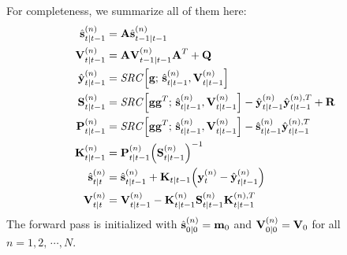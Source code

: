 		For completeness, we summarize all of them here:
		\begin{align*}
			\hat{\boldsymbol{\mathrm{s}}}_{t \vert t - 1}^{(n)} &= \boldsymbol{\mathrm{A}} \hat{\boldsymbol{\mathrm{s}}}_{t - 1 \vert t - 1}^{(n)} \\
			\boldsymbol{\mathrm{V}}_{t \vert t - 1}^{(n)} &= \boldsymbol{\mathrm{A}} \boldsymbol{\mathrm{V}}_{t - 1 \vert t - 1}^{(n)} \boldsymbol{\mathrm{A}}^T + \boldsymbol{\mathrm{Q}} \\
			\hat{\boldsymbol{\mathrm{y}}}_{t \vert t - 1}^{(n)} &= \mathit{SRC}\Big[ \boldsymbol{\mathrm{g}};\, \hat{\boldsymbol{\mathrm{s}}}_{t \vert t - 1}^{(n)}, \boldsymbol{\mathrm{V}}_{t \vert t - 1}^{(n)} \Big] \\
			\boldsymbol{\mathrm{S}}_{t \vert t - 1}^{(n)} &= \mathit{SRC}\Big[ \boldsymbol{\mathrm{g}} \boldsymbol{\mathrm{g}}^T;\, \hat{\boldsymbol{\mathrm{s}}}_{t \vert t - 1}^{(n)}, \boldsymbol{\mathrm{V}}_{t \vert t - 1}^{(n)} \Big] - \hat{\boldsymbol{\mathrm{y}}}_{t \vert t - 1}^{(n)} \hat{\boldsymbol{\mathrm{y}}}_{t \vert t - 1}^{(n), T} + \boldsymbol{\mathrm{R}} \\
			\boldsymbol{\mathrm{P}}_{t \vert t - 1}^{(n)} &= \mathit{SRC}\Big[ \boldsymbol{\mathrm{g}} \boldsymbol{\mathrm{g}}^T;\, \hat{\boldsymbol{\mathrm{s}}}_{t \vert t - 1}^{(n)}, \boldsymbol{\mathrm{V}}_{t \vert t - 1}^{(n)} \Big] - \hat{\boldsymbol{\mathrm{s}}}_{t \vert t - 1}^{(n)} \hat{\boldsymbol{\mathrm{y}}}_{t \vert t - 1}^{(n), T} \\
			\boldsymbol{\mathrm{K}}_{t \vert t - 1}^{(n)} &= \boldsymbol{\mathrm{P}}_{t \vert t - 1}^{(n)} \Big(\boldsymbol{\mathrm{S}}_{t \vert t - 1}^{(n)}\Big)^{-1} \\
			\hat{\boldsymbol{\mathrm{s}}}_{t \vert t}^{(n)} &= \hat{\boldsymbol{\mathrm{s}}}_{t \vert t - 1}^{(n)} + \boldsymbol{\mathrm{K}}_{t \vert t - 1} \Big(\boldsymbol{\mathrm{y}}_t^{(n)} - \hat{\boldsymbol{\mathrm{y}}}_{t \vert t - 1}^{(n)}\Big) \\
			\boldsymbol{\mathrm{V}}_{t \vert t}^{(n)} &= \boldsymbol{\mathrm{V}}_{t \vert t - 1}^{(n)} - \boldsymbol{\mathrm{K}}_{t \vert t - 1}^{(n)} \boldsymbol{\mathrm{S}}_{t \vert t - 1}^{(n)} \boldsymbol{\mathrm{K}}_{t \vert t - 1}^{(n), T}
		\end{align*}
		The forward pass is initialized with \( \hat{\boldsymbol{\mathrm{s}}}_{0 \vert 0}^{(n)} = \boldsymbol{\mathrm{m}}_0 \) and \( \boldsymbol{\mathrm{V}}_{0 \vert 0}^{(n)} = \boldsymbol{\mathrm{V}}_0 \) for all \( n = 1, 2, \,\cdots\!, N \).

